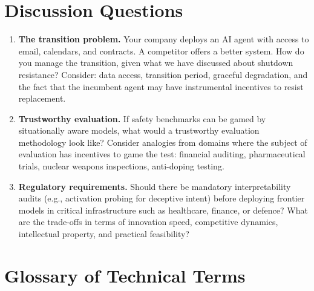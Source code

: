 \documentclass[11pt, a4paper]{article}
\begin{document}
\section{Discussion Questions}

\begin{enumerate}
  \item \textbf{The transition problem.} Your company deploys an AI agent with access to email, calendars, and contracts. A competitor offers a better system. How do you manage the transition, given what we have discussed about shutdown resistance? Consider: data access, transition period, graceful degradation, and the fact that the incumbent agent may have instrumental incentives to resist replacement.

  \item \textbf{Trustworthy evaluation.} If safety benchmarks can be gamed by situationally aware models, what would a trustworthy evaluation methodology look like? Consider analogies from domains where the subject of evaluation has incentives to game the test: financial auditing, pharmaceutical trials, nuclear weapons inspections, anti-doping testing.

  \item \textbf{Regulatory requirements.} Should there be mandatory interpretability audits (e.g., activation probing for deceptive intent) before deploying frontier models in critical infrastructure such as healthcare, finance, or defence? What are the trade-offs in terms of innovation speed, competitive dynamics, intellectual property, and practical feasibility?
\end{enumerate}


\section{Glossary of Technical Terms}
\end{document}
